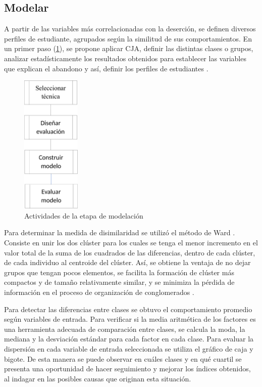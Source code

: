 \documentclass[portuguese]{textolivre}
\begin{document}
\subsection{Modelar}

A partir de las variables más correlacionadas con la deserción, se definen diversos perfiles de estudiante, agrupados según la similitud de sus comportamientos. En un primer paso (\cref{Figura 4}), se propone aplicar CJA, definir las distintas clases o grupos, analizar estadísticamente los resultados obtenidos para establecer las variables que explican el abandono y así, definir los perfiles de estudiantes \cite{Antonenko2012}.

\begin{figure}[htbp]
  \centering
  \includegraphics[width=0.25\textwidth]{images/fig-004.pdf}
  \caption{Actividades de la etapa de modelación}
  \label{Figura 4}
\end{figure}

Para determinar la medida de disimilaridad se utilizó el método de Ward \cite{Vijaya2019}. Consiste en unir los dos clúster para los cuales se tenga el menor incremento en el valor total de la suma de los cuadrados de las diferencias, dentro de cada clúster, de cada individuo al centroide del clúster. Así, se obtiene la ventaja de no dejar grupos que tengan pocos elementos, se facilita la formación de clúster más compactos y de tamaño relativamente similar, y se minimiza la pérdida de información en el proceso de organización de conglomerados \cite{Tseng2016}.

Para detectar las diferencias entre clases se obtuvo el comportamiento promedio según variables de entrada. Para verificar si la media aritmética de los factores es una herramienta adecuada de comparación entre clases, se calcula la moda, la mediana y la desviación estándar para cada factor en cada clase. Para evaluar la dispersión en cada variable de entrada seleccionada se utiliza el gráfico de caja y bigote. De esta manera se puede observar en cuáles clases y en qué cuartil se presenta una oportunidad de hacer seguimiento y mejorar los índices obtenidos, al indagar en las posibles causas que originan esta situación.
\end{document}

